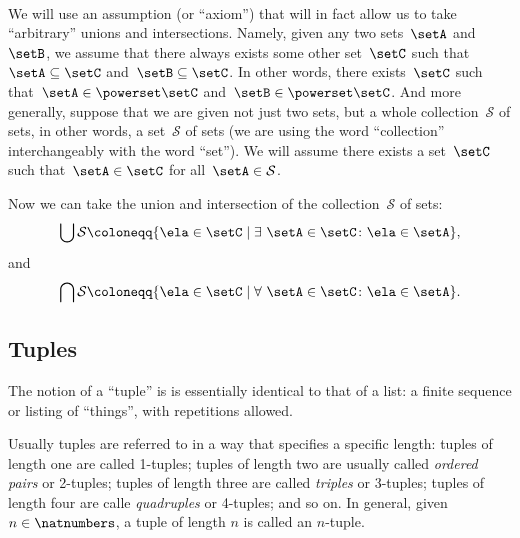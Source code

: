 \


We will use an assumption (or ``axiom'') that will in fact allow us to take ``arbitrary'' unions and intersections.
Namely, given any two sets~$\setA$ and~$\setB$, we assume that there always exists some other set~$\setC$ such that~$\setA \subseteq \setC$ and~$\setB \subseteq \setC$.
In other words, there exists~$\setC$ such that~$\setA \in \powerset \setC$ and~$\setB \in \powerset \setC$.
And more generally, suppose that we are given not just two sets, but a whole collection~$\mathcal{S}$ of sets, in other words, a set~$\mathcal{S}$ of sets (we are using the word ``collection'' interchangeably with the word ``set'').
We will assume there exists a set~$\setC$ such that~$\setA \in \setC$ for all~$\setA \in \mathcal{S}$.



Now we can take the union and intersection of the collection~$\mathcal{S}$ of sets:
%
\begin{equation*}
    \bigcup \mathcal{S} \coloneqq \{ \ela \in \setC \mid \exists \  \setA \in \setC \colon \ela \in \setA \},
\end{equation*}
%
and
%
\begin{equation*}
    \bigcap \mathcal{S} \coloneqq \{ \ela \in \setC \mid \forall \  \setA \in \setC \colon \ela \in \setA \}.
\end{equation*}


\subsection{Tuples}

The notion of a ``tuple'' is is essentially identical to that of a list: a finite sequence or listing of ``things'', with repetitions allowed. 

Usually tuples are referred to in a way that specifies a specific length: tuples of length one are called 1-tuples; tuples of length two are usually called \emph{ordered pairs} or 2-tuples; tuples of length three are called \emph{triples} or $3$-tuples; tuples of length four are calle \emph{quadruples} or 4-tuples; and so on. In general, given $n \in \natnumbers$, a tuple of length $n$ is called an $n$-tuple. 

